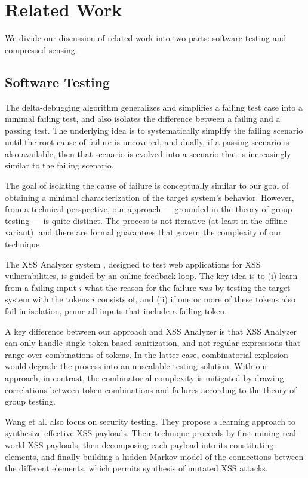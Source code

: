 \section{Related Work}

We divide our discussion of related work into two parts: software testing and compressed sensing.

\subsection{Software Testing} 

The delta-debugging algorithm \cite{XXX,XXX} generalizes and simplifies a failing test case into a minimal failing test, and also isolates the difference between a failing and a passing test. The underlying idea is to systematically simplify the failing scenario until the root cause of failure is uncovered, and dually, if a passing scenario is also available, then that scenario is evolved into a scenario that is increasingly similar to the failing scenario.

The goal of isolating the cause of failure is conceptually similar to our goal of obtaining a minimal characterization of the target system's behavior. However, from a technical perspective, our approach --- grounded in the theory of group testing --- is quite distinct. The process is not iterative (at least in the offline variant), and there are formal guarantees that govern the complexity of our technique.

The XSS Analyzer system \cite{XXX}, designed to test web applications for XSS vulnerabilities, is guided by an online feedback loop. The key idea is to (i) learn from a failing input $i$ what the reason for the failure was by testing the target system with the tokens $i$ consists of, and (ii) if one or more of these tokens also fail in isolation, prune all inputs that include a failing token.

A key difference between our approach and XSS Analyzer is that XSS Analyzer can only handle single-token-based sanitization, and not regular expressions that range over combinations of tokens. In the latter case, combinatorial explosion would degrade the process into an unscalable testing solution. With our approach, in contrast, the combinatorial complexity is mitigated by drawing correlations between token combinations and failures according to the theory of group testing.

Wang et al. \cite{FromXssAnalyzer} also focus on security testing. They propose a learning approach to synthesize effective XSS payloads. Their technique proceeds byfirst mining real-world XSS payloads,
then decomposing each payload into its constituting elements,
and finally building a hidden Markov model of the
connections between the different elements, which permits
synthesis of mutated XSS attacks.

